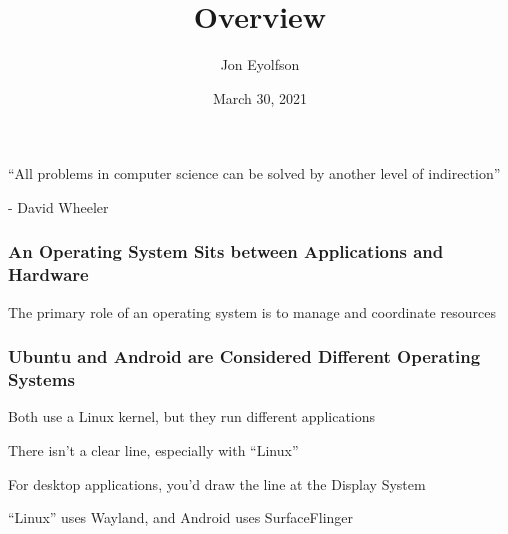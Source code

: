 

\title{Overview}
\author{Jon Eyolfson}
\date{March 30, 2021}



  \begin{frame}
    \titlepage
  \end{frame}
  
  \begin{frame}
    \vfill
    ``All problems in computer science can be solved by another level of
    indirection''

    \begin{flushright}
      - David Wheeler
    \end{flushright}
    \vfill
  \end{frame}

  \begin{frame}
    \frametitle{An Operating System Sits between Applications and Hardware}

    \centering

    \begin{flushright}
      The primary role of an operating system is to manage and coordinate resources
    \end{flushright}
  \end{frame}

  \begin{frame}
    \frametitle{Ubuntu and Android are Considered Different Operating Systems}

    Both use a Linux kernel, but they run different applications

    \vspace{2em}

    There isn't a clear line, especially with ``Linux''

    \vspace{4em}

    For desktop applications, you'd draw the line at the Display System

    \vspace{2em}

    ``Linux'' uses Wayland, and Android uses SurfaceFlinger
  \end{frame}


